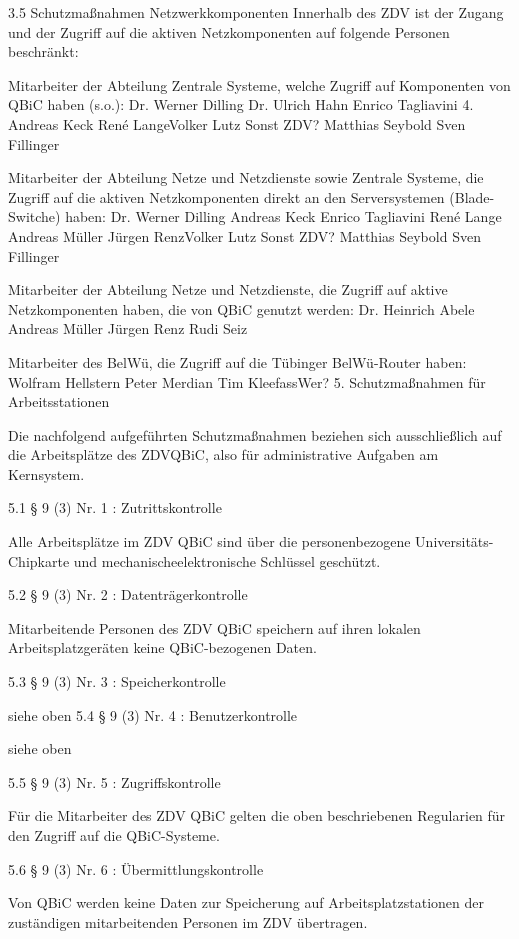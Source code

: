 \documentclass[]{scrreprt}
\begin{document}
3.5 Schutzmaßnahmen Netzwerkkomponenten
Innerhalb des ZDV ist der Zugang und der Zugriff auf die aktiven Netzkomponenten auf folgende Personen beschränkt:

Mitarbeiter der Abteilung Zentrale Systeme, welche Zugriff auf Komponenten von QBiC haben (s.o.):
Dr. Werner Dilling
Dr. Ulrich Hahn
Enrico Tagliavini
4. Andreas Keck
René LangeVolker Lutz
Sonst ZDV?
Matthias Seybold
Sven Fillinger

Mitarbeiter der Abteilung Netze und Netzdienste sowie Zentrale Systeme, die Zugriff auf die aktiven Netzkomponenten direkt an den Serversystemen (Blade-Switche) haben:
Dr. Werner Dilling
Andreas Keck
Enrico Tagliavini
René Lange
Andreas Müller
Jürgen RenzVolker Lutz
Sonst ZDV?
Matthias Seybold
Sven Fillinger

Mitarbeiter der Abteilung Netze und Netzdienste, die Zugriff auf aktive Netzkomponenten haben, die von QBiC genutzt werden:
Dr. Heinrich Abele
Andreas Müller
Jürgen Renz
Rudi Seiz

Mitarbeiter des BelWü, die Zugriff auf die Tübinger BelWü-Router haben:
Wolfram Hellstern
Peter Merdian
Tim KleefassWer?
5. Schutzmaßnahmen für Arbeitsstationen

Die nachfolgend aufgeführten Schutzmaßnahmen beziehen sich ausschließlich auf die Arbeitsplätze des ZDVQBiC, also für administrative Aufgaben am Kernsystem.

5.1 § 9 (3) Nr. 1 : Zutrittskontrolle

Alle Arbeitsplätze im ZDV QBiC sind über die personenbezogene Universitäts-Chipkarte und mechanischeelektronische Schlüssel geschützt.

5.2 § 9 (3) Nr. 2 : Datenträgerkontrolle

Mitarbeitende Personen des ZDV QBiC speichern auf ihren lokalen Arbeitsplatzgeräten keine QBiC-bezogenen Daten.

5.3 § 9 (3) Nr. 3 : Speicherkontrolle

siehe oben
5.4 § 9 (3) Nr. 4 : Benutzerkontrolle

siehe oben

5.5 § 9 (3) Nr. 5 : Zugriffskontrolle

Für die Mitarbeiter des ZDV QBiC gelten die oben beschriebenen Regularien für den Zugriff auf die QBiC-Systeme.

5.6 § 9 (3) Nr. 6 : Übermittlungskontrolle

Von QBiC werden keine Daten zur Speicherung auf Arbeitsplatzstationen der zuständigen mitarbeitenden Personen im ZDV übertragen.
\end{document}
